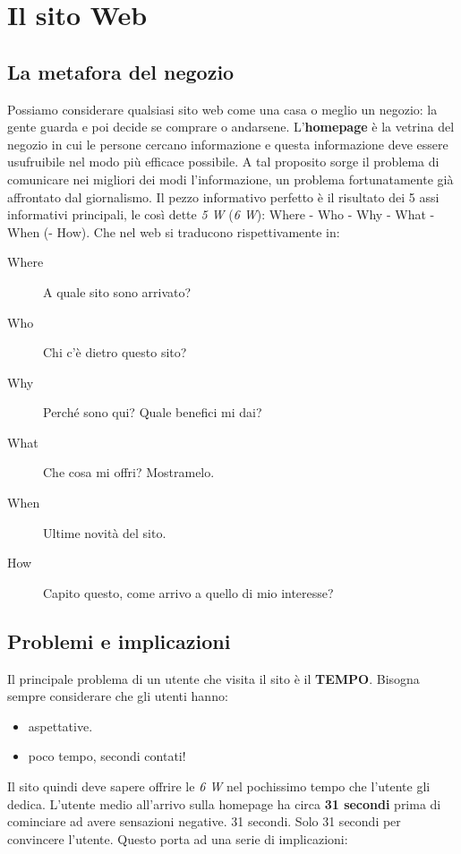 
\chapter{Il sito Web}

	\section{La metafora del negozio}
		Possiamo considerare qualsiasi sito web come una casa o meglio un negozio: la gente guarda e poi decide se comprare o andarsene.
		L'\textbf{homepage} è la vetrina del negozio in cui le persone cercano informazione e questa informazione deve essere usufruibile nel modo più efficace possibile. A tal proposito sorge il problema di comunicare nei migliori dei modi l'informazione, un problema fortunatamente già affrontato dal giornalismo. Il pezzo informativo perfetto è il risultato dei 5 assi informativi principali, le così dette \emph{5 W} (\emph{6 W}): Where - Who - Why - What - When (- How).
		Che nel web si traducono rispettivamente in:
		\begin{description}
			\item[Where] A quale sito sono arrivato?
			\item[Who] Chi c'è dietro questo sito?
			\item[Why] Perché sono qui? Quale benefici mi dai?
			\item[What] Che cosa mi offri? Mostramelo.
			\item[When] Ultime novità del sito.
			\item[How] Capito questo, come arrivo a quello di mio interesse?
		\end{description}
	
	\section{Problemi e implicazioni}
		Il principale problema di un utente che visita il sito è il \textbf{TEMPO}. Bisogna sempre considerare che gli utenti hanno:
			\begin{itemize}
				\item aspettative.
				\item poco tempo, secondi contati!
			\end{itemize}
		Il sito quindi deve sapere offrire le \emph{6 W} nel pochissimo tempo che l'utente gli dedica.	L'utente medio all'arrivo sulla homepage ha circa \textbf{31 secondi} prima di cominciare ad avere sensazioni negative. 31 secondi. Solo 31 secondi per convincere l'utente. Questo porta ad una serie di implicazioni:
		
